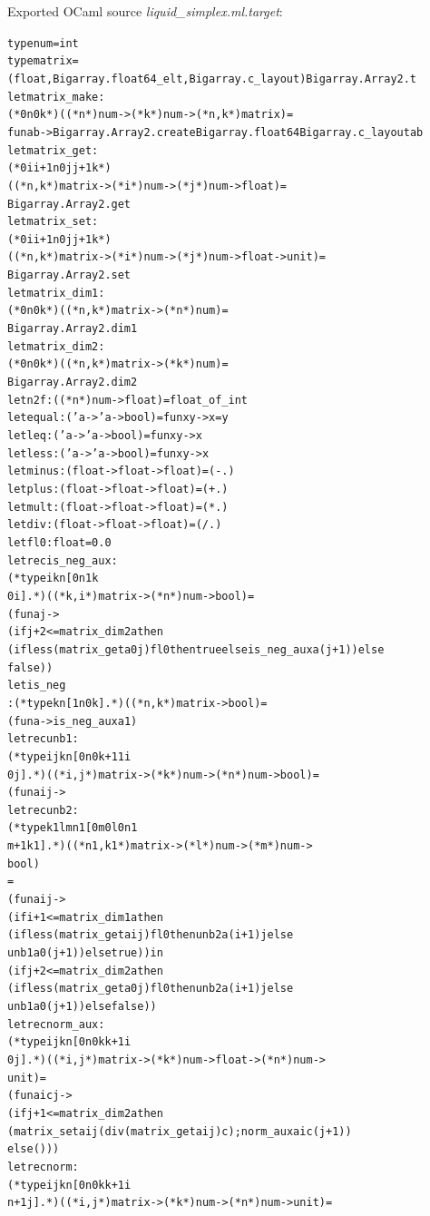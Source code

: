 \documentclass{article}
\newcommand{\tmem}[1]{{\em #1\/}}
\newenvironment{tmcode}[1][]{\begin{alltt}}{\end{alltt}}
\begin{document}
Exported OCaml source {\tmem{liquid\_simplex.ml.target}}:
\begin{tmcode}
type num = int
type matrix =
  (float, Bigarray.float64_elt, Bigarray.c_layout) Bigarray.Array2.t
let matrix_make :
  (*0  n  0  k*) ((* n *) num -> (* k *) num -> (* n, k *) matrix) =
  fun a b -> Bigarray.Array2.create Bigarray.float64 Bigarray.c_layout a b
let matrix_get :
  (*0  i  i + 1  n  0  j  j + 1  k*)
  ((* n, k *) matrix -> (* i *) num -> (* j *) num -> float) =
  Bigarray.Array2.get
let matrix_set :
  (*0  i  i + 1  n  0  j  j + 1  k*)
  ((* n, k *) matrix -> (* i *) num -> (* j *) num -> float -> unit) =
  Bigarray.Array2.set
let matrix_dim1 :
  (*0  n  0  k*) ((* n, k *) matrix -> (* n *) num) =
  Bigarray.Array2.dim1
let matrix_dim2 :
  (*0  n  0  k*) ((* n, k *) matrix -> (* k *) num) =
  Bigarray.Array2.dim2
let n2f : ((* n *) num -> float) = float_of_int
let equal : ('a -> 'a -> bool) = fun x y -> x = y
let leq : ('a -> 'a -> bool) = fun x y -> x 
let less : ('a -> 'a -> bool) = fun x y -> x 
let minus : (float -> float -> float) = (-.)
let plus : (float -> float -> float) = (+.)
let mult : (float -> float -> float) = ( *. )
let div : (float -> float -> float) = ( /. )
let fl0 : float = 0.0
let rec is_neg_aux :
  (*type i k n [0  n  1  k 
    0  i].*) ((* k, i *) matrix -> (* n *) num -> bool) =
  (fun a j ->
    (if j + 2 <= matrix_dim2 a then
    (if less (matrix_get a 0 j) fl0 then true else is_neg_aux a (j + 1)) else
    false))
let is_neg
  : (*type k n [1  n  0  k].*) ((* n, k *) matrix -> bool) =
  (fun a -> is_neg_aux a 1)
let rec unb1 :
  (*type i j k n [0  n  0  k + 1  1  i 
    0  j].*) ((* i, j *) matrix -> (* k *) num -> (* n *) num -> bool) =
  (fun a i j ->
    let rec unb2 :
    (*type k1 l m n1 [0  m  0  l  0  n1 
      m + 1  k1].*) ((* n1, k1 *) matrix -> (* l *) num -> (* m *) num ->
                         bool)
    =
    (fun a i j ->
      (if i + 1 <= matrix_dim1 a then
      (if less (matrix_get a i j) fl0 then unb2 a (i + 1) j else
      unb1 a 0 (j + 1)) else true)) in
    (if j + 2 <= matrix_dim2 a then
    (if less (matrix_get a 0 j) fl0 then unb2 a (i + 1) j else
    unb1 a 0 (j + 1)) else false))
let rec norm_aux :
  (*type i j k n [0  n  0  k  k + 1  i 
    0  j].*) ((* i, j *) matrix -> (* k *) num -> float -> (* n *) num ->
                  unit) =
  (fun a i c j ->
    (if j + 1 <= matrix_dim2 a then
    (matrix_set a i j (div (matrix_get a i j) c) ; norm_aux a i c (j + 1))
    else ()))
let rec norm :
  (*type i j k n [0  n  0  k  k + 1  i 
    n + 1  j].*) ((* i, j *) matrix -> (* k *) num -> (* n *) num -> unit) =

\end{tmcode}
\end{document}
